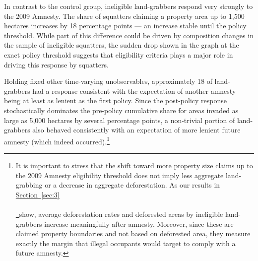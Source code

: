 \documentclass[12pt]{article}
\newcommand*{\sectionref}[2][]{%
  \hyperref[{sec:#2}]{%
    Section~\ref*{sec:#2}%
    \ifx\\#1\\%
    \else
      \,#1%
    \fi
  }%
}
\begin{document}
\quad In contrast to the control group, ineligible land-grabbers respond very strongly to the 2009 Amnesty. The share of squatters claiming a property area up to 1,500 hectares increases by 18 percentage points --- an increase stable until the policy threshold. While part of this difference could be driven by composition changes in the sample of ineligible squatters, the sudden drop shown in the graph at the exact policy threshold suggests that eligibility criteria plays a major role in driving this response by squatters. 
\ 

\quad Holding fixed other time-varying unobservables, approximately 18 of land-grabbers had a response consistent with the expectation of another amnesty being at least as lenient as the first policy. Since the post-policy response stochastically dominates the pre-policy cumulative share for areas invaded as large as 5,000 hectares by several percentage points, a non-trivial portion of land-grabbers also behaved consistently with an expectation of more lenient future amnesty (which indeed occurred).\footnote{It is important to stress that the shift toward more property size claims up to the 2009 Amnesty eligibility threshold does not imply less aggregate land-grabbing or a decrease in aggregate deforestation. As our results in \sectionref{3} show, average deforestation rates and deforested areas by ineligible land-grabbers increase meaningfully after amnesty. Moreover, since these are claimed property boundaries and not based on deforested area, they measure exactly the margin that illegal occupants would target to comply with a future amnesty.} %
\ 
\end{document}
